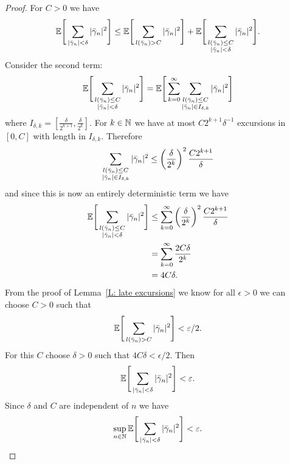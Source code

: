 \begin{proof}
	For $C > 0$ we have
	\begin{equation*}
		\mathbb{E}\Bigg[\sum_{|\bar{\gamma}_n| < \delta} |\bar{\gamma}_n|^2\Bigg]
		\leq \mathbb{E}\Bigg[\sum_{l(\bar{\gamma}_n) > C} |\bar{\gamma}_n|^2\Bigg] 
		+ \mathbb{E}\Bigg[\sum_{\substack{l(\bar{\gamma}_n) \leq C \\ |\bar{\gamma}_n| < \delta}} |\bar{\gamma}_n|^2\Bigg].
	\end{equation*}
	Consider the second term:
	\begin{equation*}
		\mathbb{E}\Bigg[\sum_{\substack{l(\bar{\gamma}_n) \leq C \\ |\bar{\gamma}_n| < \delta}} |\bar{\gamma}_n|^2\Bigg]
		= \mathbb{E}\Bigg[\sum_{k = 0}^{\infty} \sum_{\substack{l(\bar{\gamma}_n) \leq C \\ |\bar{\gamma}_n| \in I_{\delta, k}}} |\bar{\gamma}_n|^2\Bigg]
	\end{equation*}
	where $I_{\delta, k} = [ \frac{\delta}{2^{k+1}}, \frac{\delta}{2^{k}} ]$.
	For $k \in \mathbb{N}$ we have at most $C2^{k+1}\delta^{-1}$ excursions in $[0, C]$ with length in $I_{\delta, k}$.
	Therefore
	\begin{equation*}
		\sum_{\substack{l(\bar{\gamma}_n) \leq C \\ |\bar{\gamma}_n| \in I_{\delta, k}}} |\bar{\gamma}_n|^2 
		\leq \left(\frac{\delta}{2^k}\right)^2 \frac{C2^{k+1}}{\delta}
	\end{equation*}
	and since this is now an entirely deterministic term we have
	\begin{equation*}
	\begin{aligned}
	\mathbb{E}\Bigg[\sum_{\substack{l(\bar{\gamma}_n) \leq C \\ |\bar{\gamma}_n| < \delta}} |\bar{\gamma}_n|^2\Bigg] 
	&\leq \sum_{k = 0}^{\infty} \left(\frac{\delta}{2^k}\right)^2 \frac{C2^{k+1}}{\delta} \\
	&= \sum_{k = 0}^{\infty} \frac{2C\delta}{2^k} \\
	&= 4C\delta.
	\end{aligned}
	\end{equation*}
	From the proof of Lemma~\ref{L: late excursions} we know for all $\epsilon > 0$ we can choose $C > 0$ such that 
	\begin{equation*}
		\mathbb{E}\Bigg[ \sum_{l(\bar{\gamma}_n) > C} |\bar{\gamma}_n|^2 \Bigg] < \varepsilon / 2.
	\end{equation*}
	For this $C$ choose $\delta > 0$ such that $4C\delta < \epsilon/2$.
	Then
	\begin{equation*}
		\mathbb{E}\Bigg[\sum_{|\bar{\gamma}_n| < \delta} |\bar{\gamma}_n|^2\Bigg]  < \varepsilon.
	\end{equation*}
	Since $\delta$ and $C$ are independent of $n$ we have
	\begin{equation*}
	\sup_{n \in \mathbb{N}} \mathbb{E}\Bigg[\sum_{|\bar{\gamma}_n| < \delta} |\bar{\gamma}_n|^2\Bigg] < \varepsilon.
	\end{equation*}
\end{proof}



